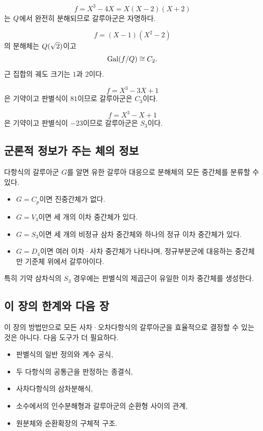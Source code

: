 \begin{example}
\[
  f=X^3-4X=X(X-2)(X+2)
\]
는 $Q$에서 완전히 분해되므로 갈루아군은 자명하다.
\end{example}

\begin{example}
\[
  f=(X-1)(X^2-2)
\]
의 분해체는 $Q(\sqrt2)$이고
\[
  \operatorname{Gal}(f/Q)\cong C_2.
\]
근 집합의 궤도 크기는 $1$과 $2$이다.
\end{example}

\begin{example}
\[
  f=X^3-3X+1
\]
은 기약이고 판별식이 $81$이므로 갈루아군은 $C_3$이다.
\end{example}

\begin{example}
\[
  f=X^3-X+1
\]
은 기약이고 판별식이 $-23$이므로 갈루아군은 $S_3$이다.
\end{example}

\subsection{군론적 정보가 주는 체의 정보}

다항식의 갈루아군 $G$를 알면 유한 갈루아 대응으로 분해체의 모든 중간체를 분류할 수 있다.

\begin{itemize}
  \item $G=C_p$이면 진중간체가 없다.
  \item $G=V_4$이면 세 개의 이차 중간체가 있다.
  \item $G=S_3$이면 세 개의 비정규 삼차 중간체와 하나의 정규 이차 중간체가 있다.
  \item $G=D_4$이면 여러 이차·사차 중간체가 나타나며, 정규부분군에 대응하는 중간체만 기준체 위에서 갈루아이다.
\end{itemize}

특히 기약 삼차식의 $S_3$ 경우에는 판별식의 제곱근이 유일한 이차 중간체를 생성한다.

\subsection{이 장의 한계와 다음 장}

이 장의 방법만으로 모든 사차·오차다항식의 갈루아군을 효율적으로 결정할 수 있는 것은 아니다. 다음 도구가 더 필요하다.

\begin{itemize}
  \item 판별식의 일반 정의와 계수 공식,
  \item 두 다항식의 공통근을 판정하는 종결식,
  \item 사차다항식의 삼차분해식,
  \item 소수에서의 인수분해형과 갈루아군의 순환형 사이의 관계,
  \item 원분체와 순환확장의 구체적 구조.
\end{itemize}

